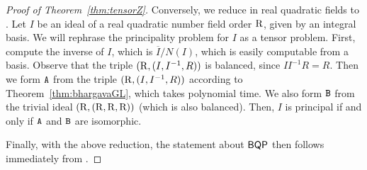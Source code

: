 \begin{proof}[Proof of Theorem~\ref{thm:tensorZ}]
Conversely, we reduce  in real quadratic fields to .  Let $I$ be an ideal of a real quadratic number field order $\mathrm{R}$, given by an integral basis.
We will rephrase the principality problem for $I$ as a tensor problem.  First, compute the inverse of $I$, which is $\overline I/N(I)$, which is easily computable from a basis.  Observe that the triple $(\mathrm{R}, (I, I^{-1},R))$ is balanced, since $I I^{-1} R = R$.  Then we form $\mathtt{A}$ from the triple $(\mathrm{R}, (I,I^{-1},R))$ according to Theorem~\ref{thm:bhargavaGL}, which takes polynomial time.  We also form $\mathtt{B}$ from the trivial ideal $(\mathrm{R}, (\mathrm{R}, \mathrm{R}, \mathrm{R}))$ (which is also balanced).  Then, $I$ is principal if and only if $\mathtt{A}$ and $\mathtt{B}$ are isomorphic.

	Finally, with the above reduction, the statement about $\mathsf{BQP}$ then follows immediately from \cite[Theorem 4.1]{Hallgren}.
\end{proof}



